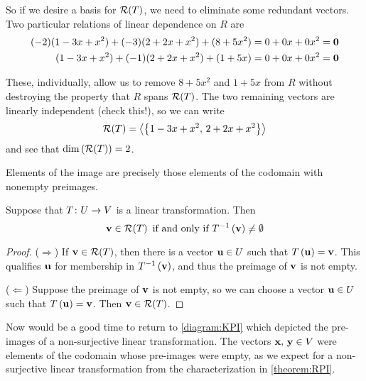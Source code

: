 \documentclass{ximera}
\begin{document}
\begin{example}
\begin{feedback}[correct]
So if we desire a basis for $\mathcal{R}\!\left(T\right)$, we need to eliminate some redundant vectors.  Two particular relations of linear dependence on $R$ are
\begin{align*}
(-2)(1-3x+x^2)+(-3)(2+2x+x^2)+(8+5x^2)&=0+0x+0x^2=\mathbf{0}\\
(1-3x+x^2)+(-1)(2+2x+x^2)+(1+5x)&=0+0x+0x^2=\mathbf{0}
\end{align*}

These, individually, allow us to remove $8+5x^2$ and $1+5x$ from $R$ without destroying the property that $R$ spans $\mathcal{R}\!\left(T\right)$.  The two remaining vectors are linearly independent (check this!), so we can write
\[
\mathcal{R}\!\left(T\right)=\left\langle\left\{1-3x+x^2,\,2+2x+x^2\right\}\right\rangle
\]
and see that $\dim\left(\mathcal{R}\!\left(T\right)\right)=2$.
\end{feedback}

\end{example}

Elements of the image are precisely those elements of the codomain with nonempty preimages.

\begin{theorem}
\label{theorem:RPI}


Suppose that $T\colon U\rightarrow V$ is a linear transformation.  Then
\[
\mathbf{v}\in\mathcal{R}\!\left(T\right)\text{ if and only if }T^{-1}\left(\mathbf{v}\right)\neq\emptyset
\]





\begin{proof}
($\Rightarrow$)  If $\mathbf{v}\in\mathcal{R}\!\left(T\right)$, then there is a vector $\mathbf{u}\in U$ such that $T\left(\mathbf{u}\right)=\mathbf{v}$.  This qualifies $\mathbf{u}$ for membership in $T^{-1}\left(\mathbf{v}\right)$, and thus the preimage of $\mathbf{v}$ is not empty.



($\Leftarrow$)  Suppose the preimage of $\mathbf{v}$ is not empty, so we can choose a vector $\mathbf{u}\in U$ such that $T\left(\mathbf{u}\right)=\mathbf{v}$.  Then $\mathbf{v}\in\mathcal{R}\!\left(T\right)$.


\end{proof}
\end{theorem}

Now would be a good time to return to \ref{diagram:KPI} which depicted the pre-images of a non-surjective linear transformation.  The vectors $\mathbf{x},\,\mathbf{y}\in V$ were elements of the codomain whose pre-images were empty, as we expect for a non-surjective linear transformation from the characterization in \ref{theorem:RPI}.
\end{document}
